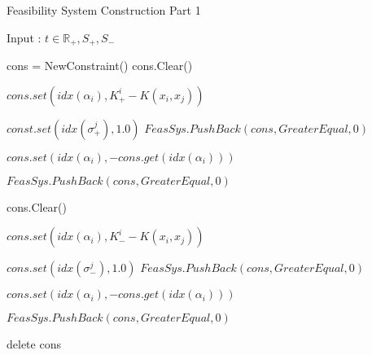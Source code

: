 \documentclass[a4paper,twoside,10pt]{report}
\begin{document}
	\begin{algorithm}
	
	\caption{Feasibility System Construction Part 1}
	\label{feassystemconstruction1}		
	
	\begin{center}
	\begin{algorithmic}	
	
	\STATE Input : \(t\in \mathbb{R}_+, S_+, S_-\)
	
	
	\STATE cons = NewConstraint()
		\STATE cons.Clear()
		
			\STATE \(cons.set(idx(\alpha_i), K^i_+ - K(x_i, x_j))\)
		\ENDFOR
		
		\STATE \(const.set(idx(\sigma^j_+), 1.0)\)
		\STATE \(FeasSys.PushBack(cons, GreaterEqual, 0)\)
		
			\STATE \(cons.set(idx(\alpha_i), - cons.get(idx(\alpha_i)))\)
		\ENDFOR
				
		\STATE \(FeasSys.PushBack(cons, GreaterEqual, 0)\)		
		
	\ENDFOR
	
		\STATE cons.Clear()
		
			\STATE \(cons.set(idx(\alpha_i), K^i_- - K(x_i, x_j))\)
		\ENDFOR
		
		\STATE \(cons.set(idx(\sigma^j_-), 1.0)\)
		\STATE \(FeasSys.PushBack(cons, GreaterEqual, 0)\)
		
			\STATE \(cons.set(idx(\alpha_i), - cons.get(idx(\alpha_i)))\)
		\ENDFOR
				
		\STATE \(FeasSys.PushBack(cons, GreaterEqual, 0)\)		
	\ENDFOR
		
	\STATE delete cons
	
	\end{algorithmic}
	\end{center}
	\end{algorithm}	
	
\end{document}
